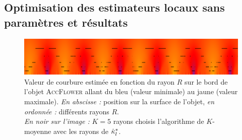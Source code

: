 \subsection{Optimisation des estimateurs locaux sans paramètres et résultats}
\label{sec:curvature:parameter-free:k-means}

\begin{figure}[ht]{
  \begin{center}
    \includegraphics[width=.95\linewidth]{images/Curvature/ScaleSpace_Flower_Local_5}
  \end{center}}
  \caption{Valeur de courbure estimée en fonction du rayon $R$ sur le bord de
  l'objet \textsc{AccFlower} allant du bleu (valeur minimale) au jaune (valeur
  maximale). \emph{En abscisse :} position sur la surface de l'objet, \emph{en
  ordonnée :} différents rayons $R$.
  \\
  \emph{En noir sur l'image :} $K = 5$ rayons choisis l'algorithme de
  $K$-moyenne avec les rayons de $\hat{\kappa}^{*}_{l}$.
  \label{fig:curvature-pfl-radii}}
\end{figure}

